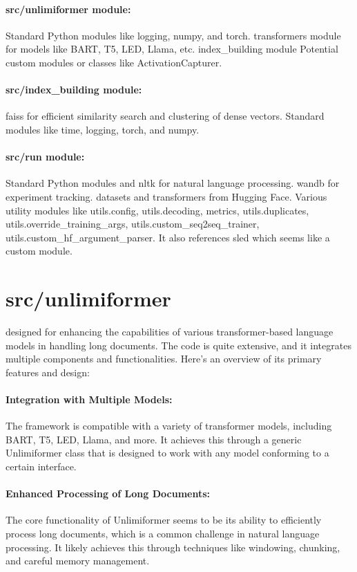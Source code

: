 \documentclass[12pt]{article}
\begin{document}
\paragraph{src/unlimiformer module:}
Standard Python modules like logging, numpy, and torch.
transformers module for models like BART, T5, LED, Llama, etc.
index\_building module
Potential custom modules or classes like ActivationCapturer.

\paragraph{{src/index\_building module}:}
faiss for efficient similarity search and clustering of dense vectors.
Standard modules like time, logging, torch, and numpy.

\paragraph{src/run module:} Standard Python modules and nltk for natural
language processing. wandb for experiment tracking. datasets and transformers
from Hugging Face. Various utility modules like utils.config, utils.decoding,
metrics, utils.duplicates, utils.override\_training\_args,
utils.custom\_seq2seq\_trainer, utils.custom\_hf\_argument\_parser. It also
references sled which seems like a custom module.





\section*{src/unlimiformer} designed for enhancing the capabilities of various
transformer-based language models in handling long documents. The code is quite
extensive, and it integrates multiple components and functionalities. Here's an
overview of its primary features and design:

\paragraph{Integration with Multiple Models:} The framework is compatible with
a variety of transformer models, including BART, T5, LED, Llama, and more. It
achieves this through a generic Unlimiformer class that is designed to work with
any model conforming to a certain interface.

\paragraph{Enhanced Processing of Long Documents:} The core functionality of
Unlimiformer seems to be its ability to efficiently process long documents,
which is a common challenge in natural language processing. It likely achieves
this through techniques like windowing, chunking, and careful memory
management.
\end{document}
